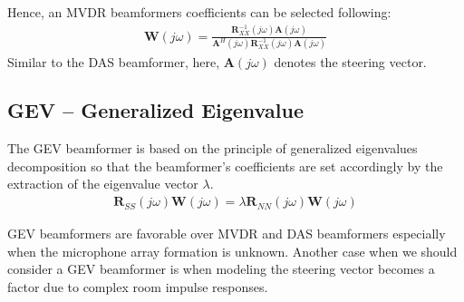 Hence, an MVDR beamformers coefficients can be selected following:
\begin{align}
    \displaystyle\mathbf{W}(j\omega) = \frac{\mathbf{R}_{XX}^{-1}(j\omega)\mathbf{A}(j\omega)}{\mathbf{A}^H(j\omega)\mathbf{R}_{XX}^{-1}(j\omega)\mathbf{A}(j\omega)}
\end{align}
Similar to the DAS beamformer, here,
\(\mathbf{A}(j\omega)\) denotes the steering vector.

\subsection{GEV -- Generalized Eigenvalue}
The GEV beamformer is based on the principle of
generalized eigenvalues decomposition so that the beamformer's
coefficients are set accordingly by the extraction of 
the eigenvalue vector \(\lambda\). 
\begin{align}
    \mathbf{R}_{SS}(j\omega)\mathbf{W}(j\omega) = \lambda\mathbf{R}_{NN}(j\omega)\mathbf{W}(j\omega)
\end{align}

GEV beamformers are favorable over MVDR and DAS 
beamformers especially when
the microphone array formation is unknown.
Another case when we should consider a GEV beamformer
is when modeling the steering vector becomes 
a factor due to complex room impulse responses.





